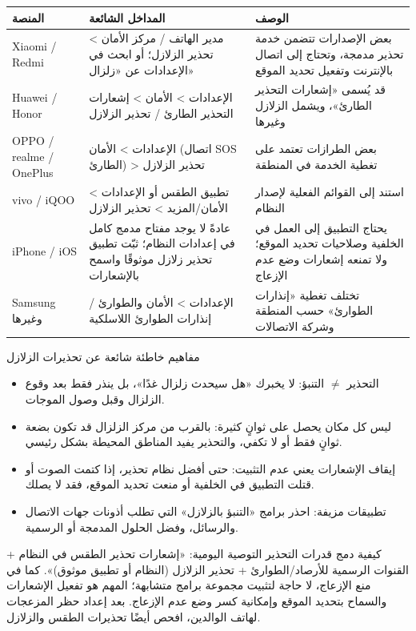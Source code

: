 \begin{center}
\begin{tabularx}{\linewidth}{|X|X|X|}
\hline
\textbf{المنصة} & \textbf{المداخل الشائعة} & \textbf{الوصف} \tabularnewline
\hline
Xiaomi / Redmi & مدير الهاتف / مركز الأمان > تحذير الزلازل؛ أو ابحث في الإعدادات عن «زلزال» & بعض الإصدارات تتضمن خدمة تحذير مدمجة، وتحتاج إلى اتصال بالإنترنت وتفعيل تحديد الموقع \tabularnewline
Huawei / Honor & الإعدادات > الأمان > إشعارات التحذير الطارئ / تحذير الزلازل & قد يُسمى «إشعارات التحذير الطارئ»، ويشمل الزلازل وغيرها \tabularnewline
OPPO / realme / OnePlus & الإعدادات > الأمان (اتصال SOS الطارئ) > تحذير الزلازل & بعض الطرازات تعتمد على تغطية الخدمة في المنطقة \tabularnewline
vivo / iQOO & تطبيق الطقس أو الإعدادات > الأمان/المزيد > تحذير الزلازل & استند إلى القوائم الفعلية لإصدار النظام \tabularnewline
iPhone / iOS & عادةً لا يوجد مفتاح مدمج كامل في إعدادات النظام؛ ثبّت تطبيق تحذير زلازل موثوقًا واسمح بالإشعارات & يحتاج التطبيق إلى العمل في الخلفية وصلاحيات تحديد الموقع؛ ولا تمنعه إشعارات وضع عدم الإزعاج \tabularnewline
Samsung وغيرها & الإعدادات > الأمان والطوارئ / إنذارات الطوارئ اللاسلكية & تختلف تغطية «إنذارات الطوارئ» حسب المنطقة وشركة الاتصالات \tabularnewline
\hline
\end{tabularx}
\end{center}

\begin{tcbwarn}{مفاهيم خاطئة شائعة عن تحذيرات الزلازل}
\begin{itemize}
  \item التحذير $\neq$ التنبؤ: لا يخبرك «هل سيحدث زلزال غدًا»، بل ينذر فقط بعد وقوع الزلزال وقبل وصول الموجات.
  \item ليس كل مكان يحصل على ثوانٍ كثيرة: بالقرب من مركز الزلزال قد تكون بضعة ثوانٍ فقط أو لا تكفي، والتحذير يفيد المناطق المحيطة بشكل رئيسي.
  \item إيقاف الإشعارات يعني عدم التثبيت: حتى أفضل نظام تحذير، إذا كتمت الصوت أو قتلت التطبيق في الخلفية أو منعت تحديد الموقع، فقد لا يصلك.
  \item تطبيقات مزيفة: احذر برامج «التنبؤ بالزلازل» التي تطلب أذونات جهات الاتصال والرسائل، وفضل الحلول المدمجة أو الرسمية.
\end{itemize}

\end{tcbwarn}

\begin{tcbinfo}{كيفية دمج قدرات التحذير}
التوصية اليومية: «إشعارات تحذير الطقس في النظام + القنوات الرسمية للأرصاد/الطوارئ + تحذير الزلازل (النظام أو تطبيق موثوق)». كما في منع الإزعاج، لا حاجة لتثبيت مجموعة برامج متشابهة؛ المهم هو تفعيل الإشعارات والسماح بتحديد الموقع وإمكانية كسر وضع عدم الإزعاج. بعد إعداد حظر المزعجات لهاتف الوالدين، افحص أيضًا تحذيرات الطقس والزلازل.

\end{tcbinfo}

